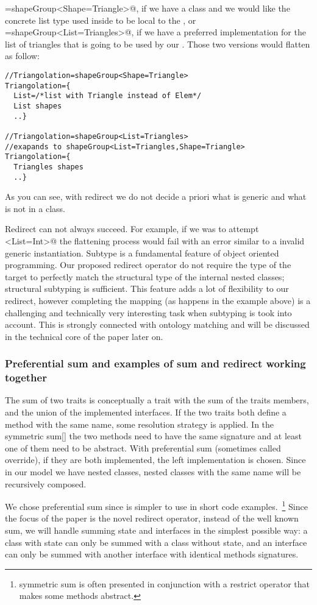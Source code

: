 \Q@Triangolation=shapeGroup<Shape=Triangle>@,
if we have a \Q@Triangle@ class and we would like the concrete list type
used inside to be local to the \Q@Triangolation@,
or 
\Q@Triangolation=shapeGroup<List=Triangles>@,
if we have a preferred implementation for the list of triangles that is going to be used by our
\Q@Triangolation@.
Those two versions would flatten as follow:
\begin{lstlisting}
//Triangolation=shapeGroup<Shape=Triangle>
Triangolation={
  List=/*list with Triangle instead of Elem*/
  List shapes
  ..}

//Triangolation=shapeGroup<List=Triangles>
//exapands to shapeGroup<List=Triangles,Shape=Triangle>
Triangolation={
  Triangles shapes
  ..}
\end{lstlisting}
As you can see, with redirect we do not decide a priori what is generic and what is not in a class.

Redirect can not always succeed. For example, if we was to attempt
\Q@shapeGroup<List=Int>@ the flattening process would fail with an error similar to a 
invalid generic instantiation.
Subtype is a fundamental feature of object oriented programming. Our proposed redirect operator
do not require the type of the target to perfectly match the structural type of the internal nested classes;
structural subtyping is sufficient.
This feature adds a lot of flexibility to our redirect,
however completing the mapping
(as happens in the example above) is a challenging and technically very interesting
task when subtyping is took into account. This is strongly connected with ontology matching and
will be discussed in the technical core of the paper later on.

\subsubsection{Preferential sum and examples of sum and redirect working together}
The sum of two traits is conceptually a trait with the sum of the traits members, and the union of the implemented interfaces.
If the two traits both define a method with the same name, some resolution strategy is applied.
In the symmetric sum[] the two methods need to have the same signature and at least one of them need to be abstract.
With preferential sum (sometimes called override), if they are both implemented, the left implementation is chosen.
Since in our model we have nested classes, nested classes with the same name will be recursively composed.

We chose preferential sum since is simpler to use in short code examples.~\footnote{symmetric sum is often presented in conjunction with a restrict operator that makes some methods abstract.}
Since the focus of the paper is the novel redirect operator, instead of the well known sum, we will handle summing state and interfaces in the simplest possible way:
a class with state can only be summed with a class without state, and an interface can only be summed with another interface with identical methods signatures.

